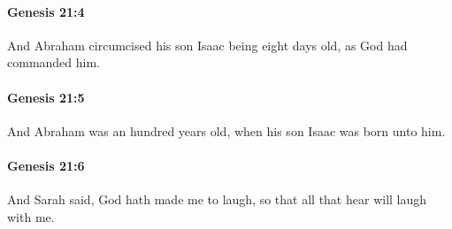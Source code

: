 		\paragraph{Genesis 21:4} %
			\label{GENESIS-21-4}

			And Abraham circumcised his son Isaac being eight days old, as God had commanded him.


		\paragraph{Genesis 21:5} %
			\label{GENESIS-21-5}

			And Abraham was an hundred years old, when his son Isaac was born unto him.


		\paragraph{Genesis 21:6} %
			\label{GENESIS-21-6}

			And Sarah said, God hath made me to laugh, so that all that hear will laugh with me.


